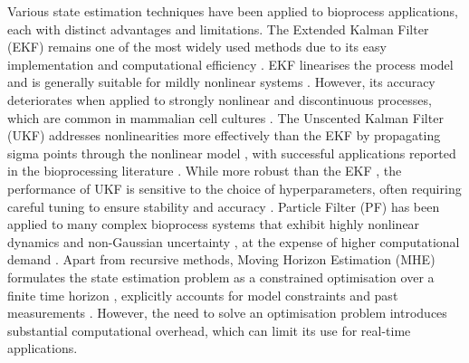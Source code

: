 Various state estimation techniques have been applied to bioprocess applications, each with distinct advantages and limitations. The Extended Kalman Filter (EKF) remains one of the most widely used methods due to its easy implementation and computational efficiency \cite{Ohadi2015DevelopmentCultures, Kramer2016On-lineCerevisiae, Gopalakrishnan2011IncorporatingEstimation, Narayanan2020Hybrid-EKF:Culture, 
Dewasme2019StateValidation, Bogaerts2004ParameterSensors, Ulonska2018ModelFed-batch}. EKF linearises the process model and is generally suitable for mildly nonlinear systems \cite{Lyubenova2021Model-basedReview}. However, its accuracy deteriorates when applied to strongly nonlinear and discontinuous processes, which are common in mammalian cell cultures \cite{Yousefi-Darani2021TheProcesses}. The Unscented Kalman Filter (UKF) addresses nonlinearities more effectively than the EKF by propagating sigma points through the nonlinear model \cite{Wan2000UnscentedEstimation}, with successful applications reported in the bioprocessing literature \cite{Fernandes2015ExtendedCultures, Dewasme2015StateCells, Abadli2021AnCultures, Kramer2019AFilter, Kolas2009ConstrainedApproach, Yousefi-Darani2021ParameterFilter, Paquet-Durand2022Online, Kemmer2023NonlinearCultivations}. While more robust than the EKF \cite{Wan2000UnscentedEstimation}, the performance of UKF is sensitive to the choice of hyperparameters, often requiring careful tuning to ensure stability and accuracy \cite{Dunik2012UnscentedScaling, Scardua2017CompleteTuning}. Particle Filter (PF) has been applied to many complex bioprocess systems that exhibit highly nonlinear dynamics and non-Gaussian uncertainty \cite{Golabgir2016CombiningProduction, Stelzer2017ComparisonBioprocesses, Kager2019ExtensionMeasurements, Sinner2022OnlineMixture, Kager2018StateMeasurements}, at the expense of higher computational demand \cite{Elfring2021ParticleTutorial}. Apart from recursive methods, Moving Horizon Estimation (MHE) formulates the state estimation problem as a constrained optimisation over a finite time horizon \cite{Robertson1996AEstimation, Rao2001ConstrainedApproach, Haseltine2005CriticalEstimation}, explicitly accounts for model constraints and past measurements \cite{Tuveri2022BioprocessApplication, HernandezRodriguez2021DynamicTrain, Alexander2020ChallengesProcesses}. However, the need to solve an optimisation problem introduces substantial computational overhead, which can limit its use for real-time applications.

